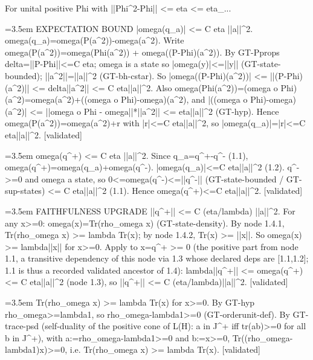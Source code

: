\documentclass{article}
\newcommand{\step}[1]{\par\noindent\hangindent=3.5em\hangafter=1%
  \makebox[3.5em][l]{\textbf{#1.}}}
\newcommand{\steptag}[1]{\hfill{\small\textsf{[#1]}}}
\begin{document}
\begin{proofbox}{For unital positive Phi with ||Phi\textasciicircum{}2-Phi|| <= eta <= eta\_...}
\step{1.2} EXPECTATION BOUND |omega(q\_a)| <= C eta ||a||\textasciicircum{}2. omega(q\_a)=omega(P(a\textasciicircum{}2))-omega(a\textasciicircum{}2). Write omega(P(a\textasciicircum{}2))=omega(Phi(a\textasciicircum{}2)) + omega((P-Phi)(a\textasciicircum{}2)). By GT-Pprops delta=||P-Phi||<=C eta; omega is a state so |omega(y)|<=||y|| (GT-state-bounded); ||a\textasciicircum{}2||=||a||\textasciicircum{}2 (GT-bh-cstar). So |omega((P-Phi)(a\textasciicircum{}2))| <= ||(P-Phi)(a\textasciicircum{}2)|| <= delta||a\textasciicircum{}2|| <= C eta||a||\textasciicircum{}2. Also omega(Phi(a\textasciicircum{}2))=(omega o Phi)(a\textasciicircum{}2)=omega(a\textasciicircum{}2)+((omega o Phi)-omega)(a\textasciicircum{}2), and |((omega o Phi)-omega)(a\textasciicircum{}2)| <= ||omega o Phi - omega||*||a\textasciicircum{}2|| <= eta||a||\textasciicircum{}2 (GT-hyp). Hence omega(P(a\textasciicircum{}2))=omega(a\textasciicircum{}2)+r with |r|<=C eta||a||\textasciicircum{}2, so |omega(q\_a)|=|r|<=C eta||a||\textasciicircum{}2. \steptag{validated} \\[4pt]
\step{1.3} omega(q\textasciicircum{}+) <= C eta ||a||\textasciicircum{}2. Since q\_a=q\textasciicircum{}+-q\textasciicircum{}- (1.1), omega(q\textasciicircum{}+)=omega(q\_a)+omega(q\textasciicircum{}-). |omega(q\_a)|<=C eta||a||\textasciicircum{}2 (1.2). q\textasciicircum{}->=0 and omega a state, so 0<=omega(q\textasciicircum{}-)<=||q\textasciicircum{}-|| (GT-state-bounded / GT-sup-states) <= C eta||a||\textasciicircum{}2 (1.1). Hence omega(q\textasciicircum{}+)<=C eta||a||\textasciicircum{}2. \steptag{validated} \\[4pt]
\step{1.4} FAITHFULNESS UPGRADE ||q\textasciicircum{}+|| <= C (eta/lambda) ||a||\textasciicircum{}2. For any x>=0: omega(x)=Tr(rho\_omega x) (GT-state-density). By node 1.4.1, Tr(rho\_omega x) >= lambda Tr(x); by node 1.4.2, Tr(x) >= ||x||. So omega(x) >= lambda||x|| for x>=0. Apply to x=q\textasciicircum{}+ >= 0 (the positive part from node 1.1, a transitive dependency of this node via 1.3 whose declared deps are [1.1,1.2]; 1.1 is thus a recorded validated ancestor of 1.4): lambda||q\textasciicircum{}+|| <= omega(q\textasciicircum{}+) <= C eta||a||\textasciicircum{}2 (node 1.3), so ||q\textasciicircum{}+|| <= C (eta/lambda)||a||\textasciicircum{}2. \steptag{validated} \\[6pt]
\step{1.4.1} Tr(rho\_omega x) >= lambda Tr(x) for x>=0. By GT-hyp rho\_omega>=lambda1, so rho\_omega-lambda1>=0 (GT-orderunit-def). By GT-trace-psd (self-duality of the positive cone of L(H): a in J\textasciicircum{}+ iff tr(ab)>=0 for all b in J\textasciicircum{}+), with a:=rho\_omega-lambda1>=0 and b:=x>=0, Tr((rho\_omega-lambda1)x)>=0, i.e. Tr(rho\_omega x) >= lambda Tr(x). \steptag{validated} \\[4pt]

\end{proofbox}
\end{document}
